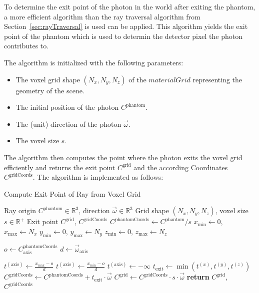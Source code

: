 To determine the exit point of the photon in the world after exiting the phantom, a more efficient algorithm than the ray traversal algorithm from Section~\ref{sec:rayTraversal} is used can be applied. This algorithm yields the exit point of the phantom which is used to determin the detector pixel the photon contributes to.

The algorithm is initialized with the following parameters:
\begin{itemize}
    \item The voxel grid shape $(N_x,N_y,N_z)$ of the $materialGrid$
    representing the
    geometry of the scene.
    \item The initial position of the photon $C^{\text{phantom}}$.
    \item The (unit) direction of the photon $\vec{\omega}$.
    \item The voxel size $s$.
\end{itemize}

The algorithm then computes the point where the photon exits the voxel grid
efficiently and returns the exit point $C^{\text{grid}}$ and the according
Coordinates $C^{\text{gridCoords}}$. The algorithm is implemented as follows:

\begin{algorithm}[H]
\caption{Compute Exit Point of Ray from Voxel Grid}
\label{alg:exitPointComputation}
\begin{algorithmic}[1]
\Require Ray origin $C^{\text{phantom}} \in \mathbb{R}^3$, direction $\vec{\omega} \in \mathbb{R}^3$
\Require Grid shape $(N_x, N_y, N_z)$, voxel size $s \in \mathbb{R}^+$
\Ensure Exit point $C^\text{grid}$, $C^{\text{gridCoords}}$
\State $C^{\text{phantomCoords}} \gets C^{\text{phantom}} / s$ 
\State $x_{\min} \gets 0$, $x_{\max} \gets N_x$
\State $y_{\min} \gets 0$, $y_{\max} \gets N_y$
\State $z_{\min} \gets 0$, $z_{\max} \gets N_z$

    \State $o \gets C^{\text{phantomCoords}}_\text{axis}$
    \State $d \gets \vec{\omega}_\text{axis}$

        \State $t^{(\text{axis})} \gets \frac{x_{\max} - o}{d}$
        \State $t^{(\text{axis})} \gets \frac{x_{\min} - o}{d}$
        \State $t^{(\text{axis})} \gets -\infty$
    \EndIf
\EndFor
\State $t_\text{exit} \gets \min(t^{(x)}, t^{(y)}, t^{(z)})$ 
\State $C^{\text{gridCoords}} \gets C^{\text{phantomCoords}} + t_\text{exit} \cdot \vec{\omega}$
\State $C^{\text{grid}} \gets C^{\text{gridCoords}} \cdot s \cdot \vec{\omega}$ 
\State \textbf{return} $C^{\text{grid}}$, $C^{\text{gridCoords}}$
\end{algorithmic}
\end{algorithm}


